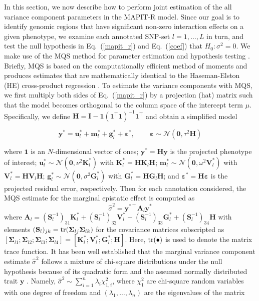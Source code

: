 \documentclass[10pt]{article}
\def\eq#1{(\ref{#1})}
\def\tr{{\rm tr}}
\newcommand{\bg}{\mathbf{g}}
\newcommand{\by}{\mathbf{y}}
\newcommand{\bu}{\mathbf{u}}
\newcommand{\bfm}{\mathbf{m}}
\newcommand{\bK}{\mathbf{K}}
\newcommand{\bV}{\mathbf{V}}
\newcommand{\bA}{\mathbf{A}}
\newcommand{\bG}{\mathbf{G}}
\newcommand{\bH}{\mathbf{H}}
\newcommand{\bI}{\mathbf{I}}
\newcommand{\bS}{\mathbf{S}}
\newcommand{\T}{\intercal}
\newcommand{\wh}{\widehat}
\newcommand{\N}{\mathcal{N}}
\newcommand{\bvarepsilon}{\boldsymbol\varepsilon}
\newcommand{\bSigma}{\boldsymbol\Sigma}
\begin{document}
In this section, we now describe how to perform joint estimation of the all variance component parameters in the MAPIT-R model. Since our goal is to identify genomic regions that have significant non-zero interaction effects on a given phenotype, we examine each annotated SNP-set $l = 1,\ldots, L$ in turn, and test the null hypothesis in Eq.~\eq{mapit_r} and Eq.~\eq{coef} that $H_0: \sigma^2=0$. We make use of the MQS method for parameter estimation and hypothesis testing \cite{Zhou2017}. Briefly, MQS is based on the computationally efficient method of moments and produces estimates that are mathematically identical to the Haseman-Elston (HE) cross-product regression \cite{Haseman1972}. To estimate the variance components with MQS, we first multiply both sides of Eq.~\eq{mapit_r} by a projection (hat) matrix such that the model becomes orthogonal to the column space of the intercept term $\mu$. Specifically, we define $\bH=\bI-\bm{1}(\bm{1}^{\T}\bm{1})^{-1}\bm{1}^{\T}$ and obtain a simplified model
\begin{linenomath*}
\begin{equation}
\by^* = \bu_l^* + \bfm_l^* + \bg_l^* +\bvarepsilon^*, \quad \, \quad  \bvarepsilon\sim \N(\bm{0},\tau^2\bH)\label{mapit_r2}
\end{equation}
\end{linenomath*}
where $\bm{1}$ is an $N$-dimensional vector of ones; $\by^* = \bH\by$ is the projected phenotype of interest; $\bu_l^*\sim \N(\bm{0},\nu^2\bK_l^*)$ with $\bK_l^* = \bH\bK_l\bH$; $\bfm_l^*\sim \N(\bm{0},\omega^2\bV_l^*)$ with $\bV_l^* = \bH\bV_l\bH$; $\bg_l^*\sim \N(\bm{0},\sigma^2\bG_l^*)$ with $\bG_l^* = \bH\bG_l\bH$; and $\bvarepsilon^* = \bH\bvarepsilon$ is the projected residual error, respectively. Then for each annotation considered, the MQS estimate for the marginal epistatic effect is computed as
\begin{equation}
\wh\sigma^2 = \by^{*\T}\bA_l\by^*
\end{equation}
where $\bA_{l} = (\bS_l^{-1})_{31}\bK_l^*+(\bS_l^{-1})_{32}\bV_l^*+(\bS_l^{-1})_{33}\bG^*_l+(\bS_l^{-1})_{34}\bH$ with elements $(\bS_l)_{jk} = \tr(\bSigma_{lj} \bSigma_{lk})$ for the covariance matrices subscripted as $[\bSigma_{l1}; \bSigma_{l2}; \bSigma_{l3}; \bSigma_{l4}]  = [\bK^*_l; \bV^*_l; \bG^*_l; \bH]$. Here, $\tr(\bullet)$ is used to denote the matrix trace function. It has been well established that the marginal variance component estimate $\wh\sigma^2$ follows a mixture of chi-square distributions under the null hypothesis because of its quadratic form and the assumed normally distributed trait $\by$ \cite{Liu2010,Wu2011,Lee2012,Ionita-Laza2013,Crawford2017a,Wang2017}. Namely, $\wh\sigma^2 \sim \sum_{i=1}^{n}\lambda_{i}\chi^2_{1,i}$, where $\chi^2_{1}$ are chi-square random variables with one degree of freedom and $(\lambda_{1},\ldots,\lambda_{n})$ are the eigenvalues of the matrix \cite{Crawford2017a,Zhou2017}
\end{document}
